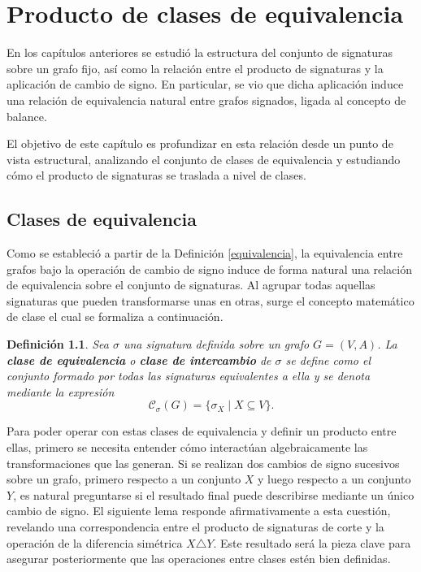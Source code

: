 \documentclass[11pt,a4paper,spanish]{report}
\theoremstyle{plain}
\newtheorem{definicion}{Definición}[chapter]
\begin{document}
\chapter{Producto de clases de equivalencia}\label{C5}

En los capítulos anteriores se estudió la estructura del conjunto de signaturas sobre un grafo fijo, así como la relación entre el producto de signaturas y la aplicación de cambio de signo. En particular, se vio que dicha aplicación induce una relación de equivalencia natural entre grafos signados,  ligada al concepto de balance.

El objetivo de este capítulo es profundizar en esta relación desde un punto de vista estructural, analizando el conjunto de clases de equivalencia y estudiando cómo el producto de signaturas se traslada a nivel de clases. 

\section{Clases de equivalencia }

\noindent
Como se estableció a partir de la Definición \ref{equivalencia}, la equivalencia entre grafos bajo la operación de cambio de signo induce de forma natural una relación de equivalencia sobre el conjunto de signaturas. Al agrupar todas aquellas signaturas que pueden transformarse unas en otras, surge el concepto matemático de clase el cual se formaliza a continuación.

\begin{definicion}\cite{zaslavsky1982signed}\label{ceq}
Sea $\sigma$ una signatura definida sobre un grafo $G=(V,A)$. La \textbf{clase de equivalencia} o \textbf{clase de intercambio} de $\sigma$ se define como el conjunto formado por todas las signaturas equivalentes a ella y se denota mediante la expresión
\[
\mathcal{C}_\sigma(G) = \{\sigma_X \mid X \subseteq V\}.
\]
\end{definicion}

Para poder operar con estas clases de equivalencia y definir un producto entre ellas, primero se necesita entender cómo interactúan algebraicamente las transformaciones que las generan. Si se realizan dos cambios de signo sucesivos sobre un grafo, primero respecto a un conjunto $X$ y luego respecto a un conjunto $Y$, es natural preguntarse si el resultado final puede describirse mediante un único cambio de signo. El siguiente lema responde afirmativamente a esta cuestión, revelando una correspondencia entre el producto de signaturas de corte y la operación de la diferencia simétrica $X \triangle Y$. Este resultado será la pieza clave para asegurar posteriormente que las operaciones entre clases estén bien definidas.
\end{document}
